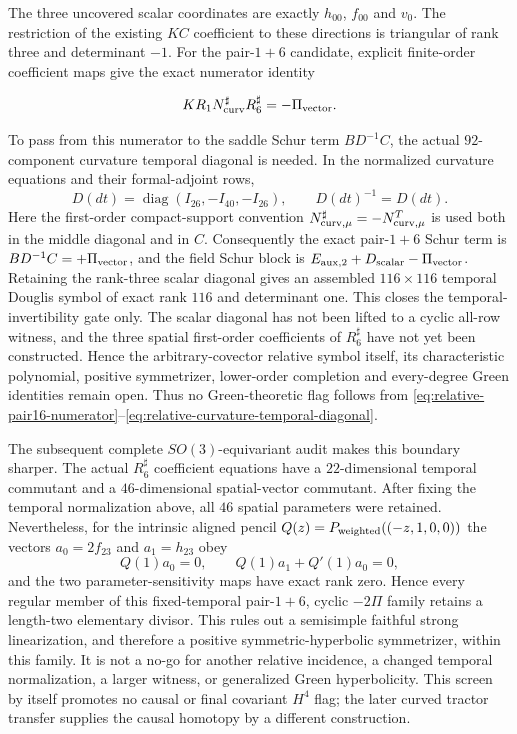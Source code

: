 \documentclass[11pt]{article}
\theoremstyle{definition}
\theoremstyle{remark}
\begin{document}
The three uncovered scalar coordinates are exactly $h_{00}$, $f_{00}$ and
$v_0$.  The restriction of the existing $KC$ coefficient to these directions
is triangular of rank three and determinant $-1$.  For the pair-$1+6$
candidate, explicit finite-order coefficient maps give the exact numerator
identity

\begin{equation}\label{eq:relative-pair16-numerator}
 K R_1 N_{\rm curv}^{\sharp}R_6^{\sharp}=-\Pi_{\rm vector}.
\end{equation}

To pass from this numerator to the saddle Schur term $BD^{-1}C$, the actual
$92$-component curvature temporal diagonal is needed.  In the normalized curvature
equations and their formal-adjoint rows,
\begin{equation}\label{eq:relative-curvature-temporal-diagonal}
 D(dt)=\operatorname{diag}(I_{26},-I_{40},-I_{26}),
 \qquad D(dt)^{-1}=D(dt).
\end{equation}
Here the first-order compact-support convention
$N_{{\rm curv},\mu}^{\sharp}=-N_{{\rm curv},\mu}^{T}$ is used both in the
middle diagonal and in $C$.  Consequently the exact pair-$1+6$ Schur term is
$BD^{-1}C=+\Pi_{\rm vector}$, and the field Schur block is
$E_{{\rm aux},2}+D_{\rm scalar}-\Pi_{\rm vector}$.  Retaining the rank-three scalar diagonal gives
an assembled $116\times116$ temporal Douglis symbol of exact rank $116$ and
determinant one.  This closes the temporal-invertibility gate only.  The
scalar diagonal has not been lifted to a cyclic all-row witness, and the
three spatial first-order coefficients of $R_6^{\sharp}$ have not yet been
constructed.  Hence the arbitrary-covector relative symbol itself, its
characteristic polynomial, positive symmetrizer,
lower-order completion and every-degree Green identities remain open.  Thus
no Green-theoretic flag follows from
\eqref{eq:relative-pair16-numerator}--\eqref{eq:relative-curvature-temporal-diagonal}.

The subsequent complete $SO(3)$-equivariant audit makes this boundary
sharper.  The actual $R_6^\sharp$ coefficient equations have a
$22$-dimensional temporal commutant and a $46$-dimensional spatial-vector
commutant.  After fixing the temporal normalization above, all $46$ spatial
parameters were retained.  Nevertheless, for the intrinsic aligned pencil
$Q(z)=P_{\rm weighted}((-z,1,0,0))$ the vectors
$a_0=2f_{23}$ and $a_1=h_{23}$ obey
\[
 Q(1)a_0=0,\qquad Q(1)a_1+Q'(1)a_0=0,
\]
and the two parameter-sensitivity maps have exact rank zero.  Hence every
regular member of this fixed-temporal pair-$1+6$, cyclic $-2\Pi$ family
retains a length-two elementary divisor.  This rules out a semisimple
faithful strong linearization, and therefore a positive symmetric-hyperbolic
symmetrizer, within this family.  It is not a no-go for another relative
incidence, a changed temporal normalization, a larger witness, or generalized
Green hyperbolicity.  This screen by itself promotes no causal or final
covariant $H^4$ flag; the later curved tractor transfer supplies the causal
homotopy by a different construction.
\end{document}
